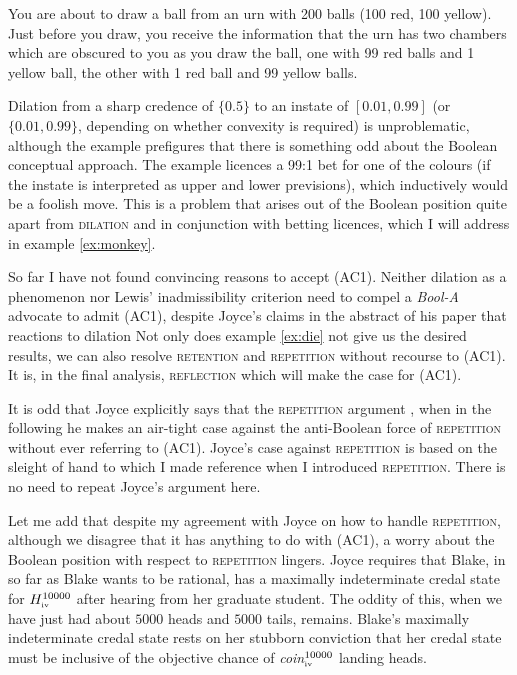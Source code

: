 \documentclass[11pt]{article}
\newcommand{\anderson}[0]{\textit{Bool-A}}
\begin{document}
\begin{quotex}
  \label{ex:urns} You are about to draw a ball
  from an urn with 200 balls (100 red, 100 yellow). Just before you
  draw, you receive the information that the urn has two chambers
  which are obscured to you as you draw the ball, one with 99 red
  balls and 1 yellow ball, the other with 1 red ball and 99 yellow
  balls.
\end{quotex}

Dilation from a sharp credence of $\{0.5\}$ to an instate of
$[0.01,0.99]$ (or $\{0.01,0.99\}$, depending on whether convexity is
required) is unproblematic, although the example prefigures that there
is something odd about the Boolean conceptual approach. The example
licences a 99:1 bet for one of the colours (if the instate is
interpreted as upper and lower previsions), which inductively would be
a foolish move. This is a problem that arises out of the Boolean
position quite apart from \textsc{dilation} and in conjunction with
betting licences, which I will address in example \ref{ex:monkey}.

So far I have not found convincing reasons to accept (AC1). Neither
dilation as a phenomenon nor Lewis' inadmissibility criterion need to
compel a {\anderson} advocate to admit (AC1), despite Joyce's claims
in the abstract of his paper that reactions to dilation  Not only does example
\ref{ex:die} not give us the desired results, we can also resolve
\textsc{retention} and \textsc{repetition} without recourse to (AC1).
It is, in the final analysis, \textsc{reflection} which will make the
case for (AC1).

It is odd that Joyce explicitly says that the \textsc{repetition}
argument  , when in the following he
makes an air-tight case against the anti-Boolean force of
\textsc{repetition} without ever referring to (AC1). Joyce's case
against \textsc{repetition} is based on the sleight of hand to which I
made reference when I introduced \textsc{repetition}. There is no need
to repeat Joyce's argument here.

Let me add that despite my agreement with Joyce on how to handle
\textsc{repetition}, although we disagree that it has anything to do
with (AC1), a worry about the Boolean position with respect to
\textsc{repetition} lingers. Joyce requires that Blake, in so far as
Blake wants to be rational, has a maximally indeterminate credal state
for $H^{10000}_{\mbox{\tiny{iv}}}$ after hearing from her graduate
student. The oddity of this, when we have just had about $5000$ heads
and $5000$ tails, remains. Blake's maximally indeterminate credal
state rests on her stubborn conviction that her credal state must be
inclusive of the objective chance of
\textit{coin}$^{10000}_{\mbox{\tiny{iv}}}$ landing heads.
\end{document}
